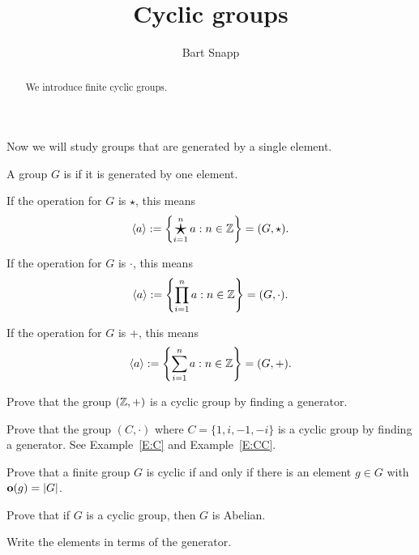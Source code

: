 \documentclass{ximera}
\author{Bart Snapp}
\title{Cyclic groups}
\begin{document}
\begin{abstract}
  We introduce finite cyclic groups.
\end{abstract}
\maketitle

Now we will study groups that are generated by a single element. 

\begin{definition}
  A group $G$ is  if it is generated by one element.


  If the operation for $G$ is $\star$, this means
  \[
  \< a\> := \left\{\bigstar_{i=1}^n a :n\in \Z\right\} = (G,\star).
  \]


  If the operation for $G$ is $\cdot$, this means
  \[
  \langle a\rangle := \left\{\prod_{i=1}^n a :n\in \mathbb Z\right\} = (G,\cdot).
  \]



  If the operation for $G$ is $+$, this means
  \[
  \langle a\rangle := \left\{\sum_{i=1}^n a :n\in \mathbb Z\right\} = (G,+).
  \]
\end{definition}


\begin{exercise}
  Prove that the group $(\mathbb Z,+)$ is a cyclic group by finding a
  generator.
\end{exercise}


\begin{exercise}
  Prove that the group $(C,\cdot)$ where $C=\{1,i,-1,-i\}$ is a cyclic
  group by finding a generator. See Example~\ref{E:C} and
  Example~\ref{E:CC}.
\end{exercise}


\begin{exercise}
  Prove that a finite group $G$ is cyclic if and only if there is an element
  $g\in G$ with $\mathbf o(g) = |G|$.
\end{exercise}



\begin{lemma}
  Prove that if $G$ is a cyclic group, then $G$ is Abelian.
  \begin{sketch}
    Write the elements in terms of the generator.
  \end{sketch}
\end{lemma}
\end{document}
